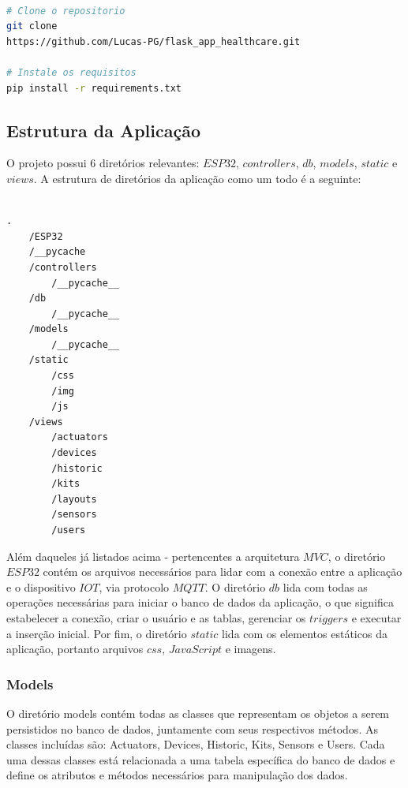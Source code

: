 \documentclass[conference, a4paper, 12pt]{IEEEtran}
\begin{document}
\begin{lstlisting}[language=bash, caption=Project Setup]

# Clone o repositorio
git clone
https://github.com/Lucas-PG/flask_app_healthcare.git

# Instale os requisitos
pip install -r requirements.txt

\end{lstlisting}

\subsection{Estrutura da Aplicação}
O projeto possui 6 diretórios relevantes: $ESP32$, $controllers$, $db$, $models$, $static$ e $views$. A estrutura de diretórios da aplicação como um todo é a seguinte:


\begin{lstlisting}[caption=Estrutura dos Diretórios]

.
    /ESP32
    /__pycache
    /controllers
        /__pycache__
    /db
        /__pycache__
    /models
        /__pycache__
    /static
        /css
        /img
        /js
    /views
        /actuators
        /devices
        /historic
        /kits
        /layouts
        /sensors
        /users

\end{lstlisting}

Além daqueles já listados acima - pertencentes a arquitetura $MVC$, o diretório $ESP32$ contém os arquivos necessários para lidar com a conexão entre a aplicação e o dispositivo $IOT$, via protocolo $MQTT$. O diretório $db$ lida com todas as operações necessárias para iniciar o banco de dados da aplicação, o que significa estabelecer a conexão, criar o usuário e as tablas, gerenciar os $triggers$ e executar a inserção inicial. Por fim, o diretório $static$ lida com os elementos estáticos da aplicação, portanto arquivos $css$, $JavaScript$ e imagens.

\subsubsection{Models}
O diretório models contém todas as classes que representam os objetos a serem persistidos no banco de dados, juntamente com seus respectivos métodos. As classes incluídas são: Actuators, Devices, Historic, Kits, Sensors e Users. Cada uma dessas classes está relacionada a uma tabela específica do banco de dados e define os atributos e métodos necessários para manipulação dos dados.
\end{document}
